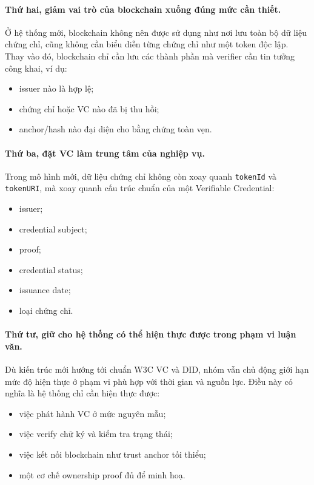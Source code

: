 \paragraph{Thứ hai, giảm vai trò của blockchain xuống đúng mức cần thiết.}
Ở hệ thống mới, blockchain không nên được sử dụng như nơi lưu toàn bộ dữ liệu chứng chỉ, cũng không cần biểu diễn từng chứng chỉ như một token độc lập. Thay vào đó, blockchain chỉ cần lưu các thành phần mà verifier cần tin tưởng công khai, ví dụ:
\begin{itemize}
    \item issuer nào là hợp lệ;
    \item chứng chỉ hoặc VC nào đã bị thu hồi;
    \item anchor/hash nào đại diện cho bằng chứng toàn vẹn.
\end{itemize}

\paragraph{Thứ ba, đặt VC làm trung tâm của nghiệp vụ.}
Trong mô hình mới, dữ liệu chứng chỉ không còn xoay quanh \texttt{tokenId} và \texttt{tokenURI}, mà xoay quanh cấu trúc chuẩn của một Verifiable Credential:
\begin{itemize}
    \item issuer;
    \item credential subject;
    \item proof;
    \item credential status;
    \item issuance date;
    \item loại chứng chỉ.
\end{itemize}

\paragraph{Thứ tư, giữ cho hệ thống có thể hiện thực được trong phạm vi luận văn.}
Dù kiến trúc mới hướng tới chuẩn W3C VC và DID, nhóm vẫn chủ động giới hạn mức độ hiện thực ở phạm vi phù hợp với thời gian và nguồn lực. Điều này có nghĩa là hệ thống chỉ cần hiện thực được:
\begin{itemize}
    \item việc phát hành VC ở mức nguyên mẫu;
    \item việc verify chữ ký và kiểm tra trạng thái;
    \item việc kết nối blockchain như trust anchor tối thiểu;
    \item một cơ chế ownership proof đủ để minh hoạ.
\end{itemize}

